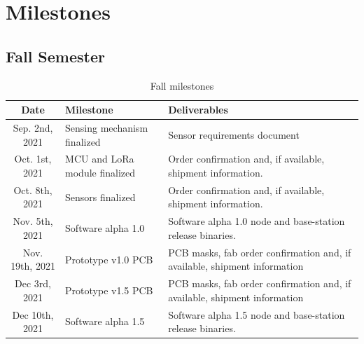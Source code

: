 \documentclass[titlepage, 11pt, letterpaper]{article}
\begin{document}
\section{Milestones}

\subsection{Fall Semester}
%
%
\begin{table}[H]
    \begin{tabularx}{\linewidth}{|c|X|X|}
        \hline
        Date & Milestone & Deliverables \\
        \hline\hline
        Sep. 2nd, 2021 
        & Sensing mechanism finalized 
        & Sensor requirements document \\
        
        \hline
        Oct. 1st, 2021
        & MCU and LoRa module finalized
        & Order confirmation and, if available, shipment information. \\
        
        \hline
        Oct. 8th, 2021 
        & Sensors finalized 
        & Order confirmation and, if available, shipment information. \\
        
        \hline
        Nov. 5th, 2021 
        & Software alpha 1.0 
        & Software alpha 1.0 node and base-station release binaries. \\ 
        
        \hline
        Nov. 19th, 2021 & Prototype v1.0 PCB 
        & PCB masks, fab order confirmation and, if available, shipment information \\
        
        \hline
        Dec 3rd, 2021 & Prototype v1.5 PCB 
        & PCB masks, fab order confirmation and, if available, shipment information \\
        
        \hline
        Dec 10th, 2021 
        & Software alpha 1.5 
        & Software alpha 1.5 node and base-station release binaries. \\ 
        
        \hline
    \end{tabularx}
    \caption{Fall milestones}
\end{table}
\end{document}
